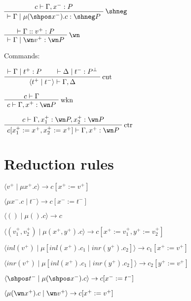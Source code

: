 \(\AxRule{c\vdash \Gamma, x^-: P}
\LabelRule{\shneg}
\UnaRule{\vdash\Gamma \mid \mu(\shpos x^-).c : \shneg P}
\DisplayProof\)

\(\AxRule{\vdash \Gamma :: v^+ : P}
\LabelRule{\wn}
\UnaRule{\vdash\Gamma \mid \wn v^+ : \wn P}
\DisplayProof\)

Commands:

\(\AxRule{\vdash \Gamma \mid t^+ : P}
\AxRule{\vdash \Delta \mid t^- : P\orth}
\LabelRule{\rulename{cut}}
\BinRule{\langle t^+ \mid t^-\rangle\vdash\Gamma, \Delta}
\DisplayProof\)

\(\AxRule{c \vdash \Gamma}
\LabelRule{\rulename{wkn}}
\UnaRule{c \vdash\Gamma, x^+: \wn P}
\DisplayProof\)

\(\AxRule{c \vdash \Gamma, x_1^+:\wn P, x_2^+:\wn P}
\LabelRule{\rulename{ctr}}
\UnaRule{c[x_1^+ := x^+, x_2^+ := x^+] \vdash\Gamma, x^+: \wn P}
\DisplayProof\)

\section{Reduction rules}\label{reduction-rules}

\(\langle v^+ \mid \mu x^+.c \rangle \rightarrow c[ x^+ := v^+]\)

\(\langle \mu x^-.c \mid t^- \rangle \rightarrow c[x^- := t^-]\)

\(\langle () \mid \mu().c \rangle \rightarrow c\)

\(\langle (v_1^+, v_2^+) \mid \mu(x^+, y^+).c \rangle \rightarrow c[x^+ := v_1^+, y^+ := v_2^+]\)

\(\langle inl(v^+) \mid \mu[inl(x^+).c_1 \mid inr(y^+).c_2] \rangle \rightarrow c_1[x^+ := v^+]\)

\(\langle inr(v^+) \mid \mu[inl(x^+).c_1 \mid inr(y^+).c_2] \rangle \rightarrow c_2[y^+ := v^+]\)

\(\langle \shpos t^- \mid \mu(\shpos x^-).c \rangle \rightarrow c[x^- := t^-]\)

\(\langle \mu(\wn x^+).c \mid \wn v^+ \rangle \rightarrow c[x^+ := v^+]\)



